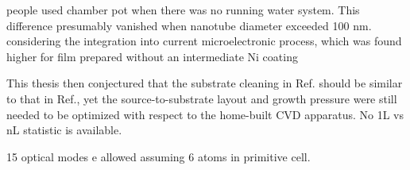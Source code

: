 people used chamber pot when there was no running water system. 
This difference presumably vanished when nanotube diameter exceeded 100 nm. considering the integration into current microelectronic process, which was found higher for film prepared without an intermediate Ni coating

This thesis then conjectured that the substrate cleaning in Ref.\cite{Peimyoo2013} should be similar to that in Ref.\cite{VanderZande2013}, yet the source-to-substrate layout and growth pressure were still needed to be optimized with respect to the home-built CVD apparatus. No 1L vs nL statistic is available.


15 optical modes e allowed assuming 6 atoms in primitive cell.

















